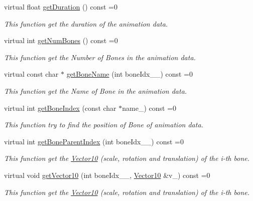 \begin{DoxyCompactItemize}
virtual float \hyperlink{class_magnum_1_1_skeletal_anim_base_ad4bd0ed7e92e55bd20bb10e33f4be986}{get\+Duration} () const  =0
\begin{DoxyCompactList}\small\item\em This function get the duration of the animation data. \end{DoxyCompactList}\item 
virtual int \hyperlink{class_magnum_1_1_skeletal_anim_base_aa54468093c1c4013120edeedb328c108}{get\+Num\+Bones} () const  =0
\begin{DoxyCompactList}\small\item\em This function get the Number of Bones in the animation data. \end{DoxyCompactList}\item 
virtual const char $\ast$ \hyperlink{class_magnum_1_1_skeletal_anim_base_a69ce23d2cf00b9dde7a74c2182336070}{get\+Bone\+Name} (int bone\+Idx\+\_\+\+\_\+) const  =0
\begin{DoxyCompactList}\small\item\em This function get the Name of Bone in the animation data. \end{DoxyCompactList}\item 
virtual int \hyperlink{class_magnum_1_1_skeletal_anim_base_a5f18e02a292e1ad887c13b3a7bd9ec58}{get\+Bone\+Index} (const char $\ast$name\+\_\+) const  =0
\begin{DoxyCompactList}\small\item\em This function try to find the position of Bone of animation data. \end{DoxyCompactList}\item 
virtual int \hyperlink{class_magnum_1_1_skeletal_anim_base_a3f4a937de3dff61073c7730421465479}{get\+Bone\+Parent\+Index} (int bone\+Idx\+\_\+\+\_\+) const  =0
\begin{DoxyCompactList}\small\item\em This function get the \hyperlink{class_magnum_1_1_vector10}{Vector10} (scale, rotation and translation) of the i-\/th bone. \end{DoxyCompactList}\item 
virtual void \hyperlink{class_magnum_1_1_skeletal_anim_base_a4349fe8f84e7c7ac3324ac163e0fe727}{get\+Vector10} (int bone\+Idx\+\_\+\+\_\+, \hyperlink{class_magnum_1_1_vector10}{Vector10} \&v\+\_\+) const  =0
\begin{DoxyCompactList}\small\item\em This function get the \hyperlink{class_magnum_1_1_vector10}{Vector10} (scale, rotation and translation) of the i-\/th bone. \end{DoxyCompactList}\item 

\end{DoxyCompactItemize}

